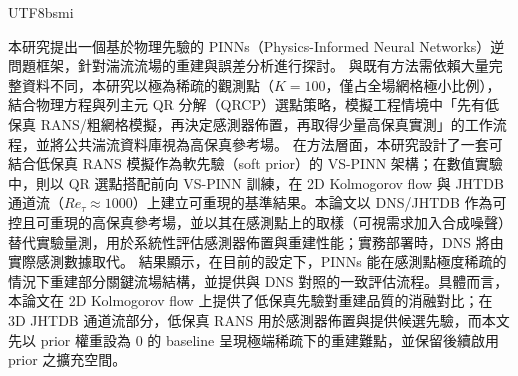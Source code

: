 \documentclass[master]{NTHUthesis}
\begin{document}
\begin{CJK*}{UTF8}{bsmi}

\makecover


\begin{abstractZH}
本研究提出一個基於物理先驗的 PINNs（Physics-Informed Neural Networks）逆問題框架，針對湍流流場的重建與誤差分析進行探討。
與既有方法需依賴大量完整資料不同，本研究以極為稀疏的觀測點（$K = 100$，僅占全場網格極小比例），結合物理方程與列主元 QR 分解（QRCP）選點策略，模擬工程情境中「先有低保真 RANS/粗網格模擬，再決定感測器佈置，再取得少量高保真實測」的工作流程，並將公共湍流資料庫視為高保真參考場。
在方法層面，本研究設計了一套可結合低保真 RANS 模擬作為軟先驗（soft prior）的 VS-PINN 架構；在數值實驗中，則以 QR 選點搭配前向 VS-PINN 訓練，在 2D Kolmogorov flow 與 JHTDB 通道流（$Re_\tau \approx 1000$）上建立可重現的基準結果。本論文以 DNS/JHTDB 作為可控且可重現的高保真參考場，並以其在感測點上的取樣（可視需求加入合成噪聲）替代實驗量測，用於系統性評估感測器佈置與重建性能；實務部署時，DNS 將由實際感測數據取代。
結果顯示，在目前的設定下，PINNs 能在感測點極度稀疏的情況下重建部分關鍵流場結構，並提供與 DNS 對照的一致評估流程。具體而言，本論文在 2D Kolmogorov flow 上提供了低保真先驗對重建品質的消融對比；在 3D JHTDB 通道流部分，低保真 RANS 用於感測器佈置與提供候選先驗，而本文先以 prior 權重設為 0 的 baseline 呈現極端稀疏下的重建難點，並保留後續啟用 prior 之擴充空間。
\end{abstractZH}



\end{CJK*}
\end{document}
